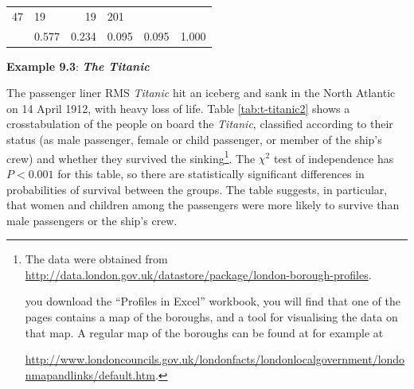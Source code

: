 \documentclass[11pt,a4paper,openany]{book}
\let\rmarkdownfootnote\footnote%
\def\footnote{\protect\rmarkdownfootnote}
\begin{document}
\begin{longtable}[]{@{}llrlrl@{}}
\begin{minipage}[t]{0.06\columnwidth}
47\strut
\end{minipage} & \begin{minipage}[t]{0.06\columnwidth}\raggedright\strut
19\strut
\end{minipage} & \begin{minipage}[t]{0.06\columnwidth}\raggedleft\strut
19\strut
\end{minipage} & \begin{minipage}[t]{0.04\columnwidth}\raggedright\strut
201\strut
\end{minipage}\tabularnewline
\begin{minipage}[t]{0.30\columnwidth}\raggedright\strut
\strut
\end{minipage} & \begin{minipage}[t]{0.30\columnwidth}\raggedright\strut
0.577\strut
\end{minipage} & \begin{minipage}[t]{0.06\columnwidth}\raggedleft\strut
0.234\strut
\end{minipage} & \begin{minipage}[t]{0.06\columnwidth}\raggedright\strut
0.095\strut
\end{minipage} & \begin{minipage}[t]{0.06\columnwidth}\raggedleft\strut
0.095\strut
\end{minipage} & \begin{minipage}[t]{0.04\columnwidth}\raggedright\strut
1.000\strut
\end{minipage}\tabularnewline
\bottomrule
\end{longtable}

\textbf{Example 9.3}: \textbf{\emph{The Titanic}}

The passenger liner RMS \emph{Titanic} hit an iceberg and sank in the
North Atlantic on 14 April 1912, with heavy loss of life. Table
\ref{tab:t-titanic2} shows a crosstabulation of the people on board the
\emph{Titanic}, classified according to their status (as male passenger,
female or child passenger, or member of the ship's crew) and whether
they survived the sinking\footnote{The data were obtained from
  \url{http://data.london.gov.uk/datastore/package/london-borough-profiles}.

  \noindentIf you download the ``Profiles in Excel'' workbook, you will
  find that one of the pages contains a map of the boroughs, and a tool
  for visualising the data on that map. A regular map of the boroughs
  can be found at for example at

  \url{http://www.londoncouncils.gov.uk/londonfacts/londonlocalgovernment/londonmapandlinks/default.htm}.}.
The \(\chi^{2}\) test of independence has \(P<0.001\) for this table, so
there are statistically significant differences in probabilities of
survival between the groups. The table suggests, in particular, that
women and children among the passengers were more likely to survive than
male passengers or the ship's crew.
\end{document}
